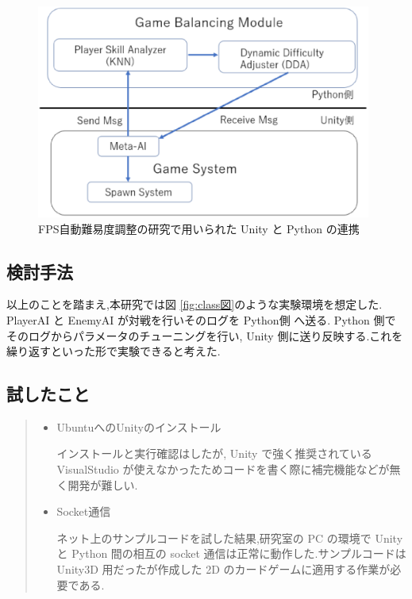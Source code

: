 \documentclass{jarticle}     %
\begin{document}
\begin{figure}[htbp]
  \centering
  \includegraphics[width=110mm]{assets/Figure3.eps}
  \caption{FPS自動難易度調整の研究で用いられた Unity と Python の連携}
  \label{fig:Unity}
\end{figure}

\subsection{検討手法}
以上のことを踏まえ,本研究では図 \ref{fig:class図}のような実験環境を想定した.
PlayerAI と EnemyAI が対戦を行いそのログを Python側 へ送る. Python 側でそのログからパラメータのチューニングを行い, Unity 側に送り反映する.これを繰り返すといった形で実験できると考えた.

\subsection{試したこと}

\begin{quote}
  \begin{itemize}
   \item UbuntuへのUnityのインストール
   \par
   インストールと実行確認はしたが, Unity で強く推奨されている VisualStudio が使えなかったためコードを書く際に補完機能などが無く開発が難しい.
   \item Socket通信
   \par 
   ネット上のサンプルコード\cite{サンプルコード}を試した結果,研究室の PC の環境で Unity と Python 間の相互の socket 通信は正常に動作した.サンプルコードは Unity3D 用だったが作成した 2D のカードゲームに適用する作業が必要である.
  \end{itemize}
 \end{quote}
\end{document}
